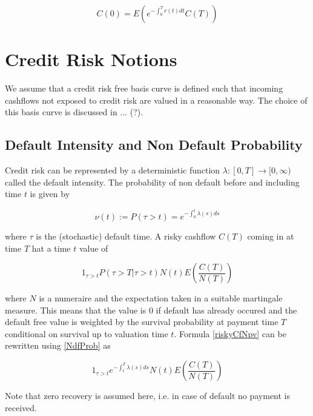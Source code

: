 \documentclass{article}%
\begin{document}
\begin{equation}
C(0) = E( e^{-\int_{0}^{T} r(t) dt} C(T) )
\end{equation}



\section{Credit Risk Notions}

We assume that a credit risk free basis curve is defined such that incoming cashflows not exposed to credit risk are valued in a reasonable way. The choice
of this basis curve is discussed in ... (?).

\subsection{Default Intensity and Non Default Probability}

Credit risk can be represented by a deterministic function $\lambda: [0,T] \rightarrow [0,\infty)$ called
the default intensity. The probability of non default before and including time $t$ is given by

\begin{equation}\label{NdfProb}
\nu(t) := P(\tau > t) = e^{-\int_{0}^{t} \lambda(s) ds}
\end{equation}

where $\tau$ is the (stochastic) default time. A risky cashflow $C(T)$ coming in at time $T$ hat a time $t$ value of

\begin{equation}\label{riskyCfNpv}
1_{\tau > t} P(\tau > T | \tau > t) N(t) E\left(\frac{C(T)}{N(T)}\right)
\end{equation}

where $N$ is a numeraire and the expectation taken in a suitable martingale measure. This means that the value is $0$
if default has already occured and the default free value is weighted by the survival probability at payment time $T$
conditional on survival up to valuation time $t$. Formula \ref{riskyCfNpv} can be rewritten using \ref{NdfProb} as

\begin{equation}\label{riskyCfNpv2}
1_{\tau > t} e^{-\int_{t}^{T} \lambda(s) ds} N(t) E\left( \frac{C(T)}{N(T)} \right)
\end{equation}

Note that zero recovery is assumed here, i.e. in case of default no payment is received.
\end{document}

